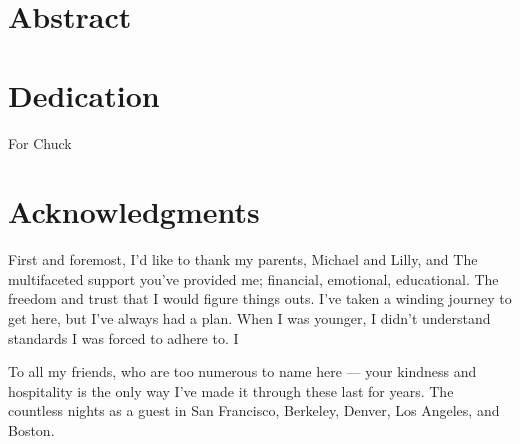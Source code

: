 \documentclass[11pt, oneside, openany]{scrbook}
\begin{document}
\newpage
\setcounter{page}{1} %
\section*{Abstract}
\lipsum[1]


\newpage
\section*{Dedication}
\begin{center}
  \vfill
  For Chuck
  \vfill
  \null
\end{center}
%


\newpage
\section*{Acknowledgments}
First and foremost, I'd like to thank my parents, Michael and Lilly, and  The multifaceted support you've provided me; financial, emotional, educational. The freedom and trust that I would figure things outs. I've taken a winding journey to get here, but I've always had a plan. When I was younger, I didn't understand standards I was forced to adhere to. I

To all my friends, who are too numerous to name here --- your kindness and hospitality is the only way I've made it through these last for years. The countless nights as a guest in San Francisco, Berkeley, Denver, Los Angeles, and Boston.



\setcounter{tocdepth}{1}

\tableofcontents

\listoftables

\listoffigures
\mainmatter




\backmatter
\end{document}
